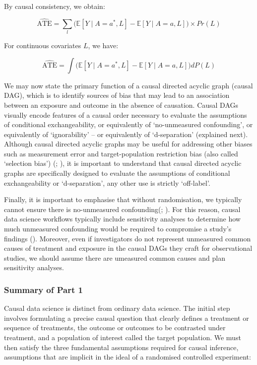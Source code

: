 \documentclass[
  single column]{article}
\begin{document}
By causal consistency, we obtain:

\[
\widehat{\text{ATE}} =  \sum_l \big( \mathbb{E}[Y \mid A = a^*, L] - \mathbb{E}[Y \mid A = a, L] \big) \times Pr(L)
\]

For continuous covariates \(L\), we have:

\[
\widehat{\text{ATE}} = \int \big( \mathbb{E}[Y \mid A = a^*, L] - \mathbb{E}[Y \mid A = a, L] \big) dP(L)
\]

We may now state the primary function of a causal directed acyclic graph
(causal DAG), which is to identify sources of bias that may lead to an
association between an exposure and outcome in the absence of causation.
Causal DAGs visually encode features of a causal order necessary to
evaluate the assumptions of conditional exchangeability, or equivalently
of `no-unmeasured confounding', or equivalently of `ignorability' -- or
equivalently of `d-separation' (explained next). Although causal
directed acyclic graphs may be useful for addressing other biases such
as measurement error and target-population restriction bias (also called
`selection bias') (;
), it is
important to understand that causal directed acyclic graphs are
specifically designed to evaluate the assumptions of conditional
exchangeability or `d-separation', any other use is strictly
`off-label'.

Finally, it is important to emphasise that without randomisation, we
typically cannot ensure there is no-unmeasured
confounding(;
). For this reason, causal
data science workflows typically include sensitivity analyses to
determine how much unmeasured confounding would be required to
compromise a study's findings
(). Moreover,
even if investigators do not represent unmeasured common causes of
treatment and exposure in the causal DAGs they craft for observational
studies, we should assume there are umeasured common causes and plan
sensitivity analyses.

\subsubsection{Summary of Part 1}\label{summary-of-part-1}

Causal data science is distinct from ordinary data science. The initial
step involves formulating a precise causal question that clearly defines
a treatment or sequence of treatments, the outcome or outcomes to be
contrasted under treatment, and a population of interest called the
target population. We must then satisfy the three fundamental
assumptions required for causal inference, assumptions that are implicit
in the ideal of a randomised controlled experiment:
\end{document}
